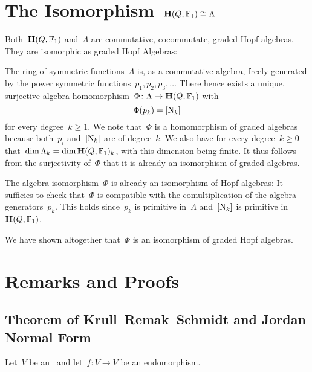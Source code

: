 \documentclass[a4paper,11pt]{scrartcl}
\begin{document}
\section{The Isomorphism~$\mathbf{H}(Q, \mathbb{F}_1) \cong \Lambda$}

Both~$\mathbf{H}(Q, \mathbb{F}_1)$ and~$\Lambda$ are commutative, cocommutate, graded Hopf algebras.
They are isomorphic as graded Hopf Algebras:

The ring of symmetric functions~$\Lambda$ is, as a commutative algebra, freely generated by the power symmetric functions~$p_1, p_2, p_3, \dotsc$
There hence exists a unique, surjective algebra homomorphism~$\Phi \colon \Lambda \to \mathbf{H}(Q, \mathbb{F}_1)$ with
\[
  \Phi(p_k) = [\mathrm{N}_k]
\]
for every degree~$k \geq 1$.
We note that~$\Phi$ is a homomorphism of graded algebras because both~$p_i$ and~$[ \mathrm{N}_k ]$ are of degree~$k$.
We also have for every degree~$k \geq 0$ that~$\dim \Lambda_k = \dim \mathbf{H}(Q, \mathbb{F}_1)_k$, with this dimension being finite.
It thus follows from the surjectivity of~$\Phi$ that it is already an isomorphism of graded algebras.

The algebra isomorphism~$\Phi$ is already an isomorphism of Hopf algebras:
It sufficies to check that~$\Phi$ is compatible with the comultiplication of the algebra generators~$p_k$.
This holds since~$p_k$ is primitive in~$\Lambda$ and~$[ \mathrm{N}_k ]$ is primitive in~$\mathbf{H}(Q, \mathbb{F}_1)$.

We have shown altogether that~$\Phi$ is an isomorphism of graded Hopf algebras.






\newpage
\appendix
\section{Remarks and Proofs}



\subsection{Theorem of Krull--Remak--Schmidt and Jordan Normal Form}
\label{jordan normal form}

Let~$V$ be an~ and let~$f \colon V \to V$ be an endomorphism.
\end{document}
